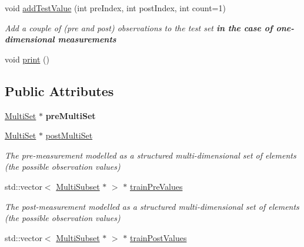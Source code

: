 \begin{DoxyCompactItemize}
void \hyperlink{classPredictionDataset_a8298f94fac0d5b3761effdb20405417a}{add\-Test\-Value} (int pre\-Index, int post\-Index, int count=1)
\begin{DoxyCompactList}\small\item\em Add a couple of (pre and post) observations to the test set {\bfseries in the case of one-\/dimensional measurements} \end{DoxyCompactList}\item 
void \hyperlink{classPredictionDataset_a2d4d421a0299c9f965965f1d3797316e}{print} ()
\end{DoxyCompactItemize}
\subsection*{Public Attributes}
\begin{DoxyCompactItemize}
\item 
\hypertarget{classPredictionDataset_a47b4d8ccf188271ce59ee481377a3c5f}{\hyperlink{classMultiSet}{Multi\-Set} $\ast$ {\bfseries pre\-Multi\-Set}}\label{classPredictionDataset_a47b4d8ccf188271ce59ee481377a3c5f}

\item 
\hypertarget{classPredictionDataset_a22343b4582412434376af66cb42d2d50}{\hyperlink{classMultiSet}{Multi\-Set} $\ast$ \hyperlink{classPredictionDataset_a22343b4582412434376af66cb42d2d50}{post\-Multi\-Set}}\label{classPredictionDataset_a22343b4582412434376af66cb42d2d50}

\begin{DoxyCompactList}\small\item\em The pre-\/measurement modelled as a structured multi-\/dimensional set of elements (the possible observation values) \end{DoxyCompactList}\item 
\hypertarget{classPredictionDataset_af09491db0c4267fa086bf640c4740483}{std\-::vector$<$ \hyperlink{classMultiSubset}{Multi\-Subset} $\ast$ $>$ $\ast$ \hyperlink{classPredictionDataset_af09491db0c4267fa086bf640c4740483}{train\-Pre\-Values}}\label{classPredictionDataset_af09491db0c4267fa086bf640c4740483}

\begin{DoxyCompactList}\small\item\em The post-\/measurement modelled as a structured multi-\/dimensional set of elements (the possible observation values) \end{DoxyCompactList}\item 
\hypertarget{classPredictionDataset_a30e9419638339a7497f3d234780b2c20}{std\-::vector$<$ \hyperlink{classMultiSubset}{Multi\-Subset} $\ast$ $>$ $\ast$ \hyperlink{classPredictionDataset_a30e9419638339a7497f3d234780b2c20}{train\-Post\-Values}}\label{classPredictionDataset_a30e9419638339a7497f3d234780b2c20}


\end{DoxyCompactItemize}

